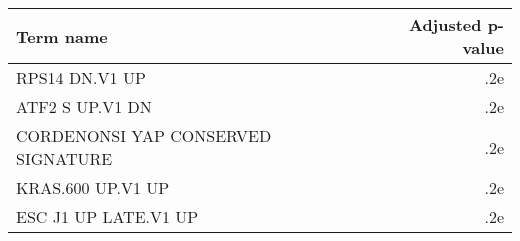 \begin{tabular}{lr}
\toprule
                         Term name &  Adjusted p-value \\
\midrule
                    RPS14 DN.V1 UP &               .2e \\
                   ATF2 S UP.V1 DN &               .2e \\
CORDENONSI YAP CONSERVED SIGNATURE &               .2e \\
                 KRAS.600 UP.V1 UP &               .2e \\
              ESC J1 UP LATE.V1 UP &               .2e \\
\bottomrule
\end{tabular}
